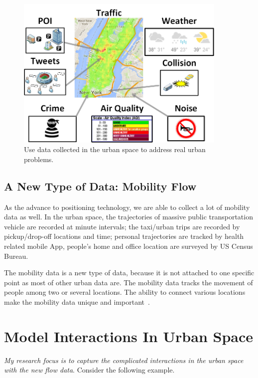 \begin{figure}[h]
\centering
\includegraphics[width=0.9\textwidth]{fig/intro-data.png}
\caption{Use data collected in the urban space to address real urban problems.}
\label{fig:demo-data}
\end{figure}




\subsection{A New Type of Data: Mobility Flow}


As the advance to positioning technology, we are able to collect a lot of mobility data as well.
In the urban space, the trajectories of massive public transportation vehicle are recorded at minute intervals; the taxi/urban trips are recorded by pickup/drop-off locations and time; personal trajectories are tracked by health related mobile App, people's home and office location are surveyed by US Census Bureau.


The mobility data is a new type of data, because it is not attached to one specific point as most of other urban data are.
The mobility data tracks the movement of people among two or several locations. The ability to connect various locations make the mobility data unique and important~\cite{ZCWY14}.




\section{Model Interactions In Urban Space}

\emph{My research focus is to capture the complicated interactions in the urban space with the new flow data}. Consider the following  example.


